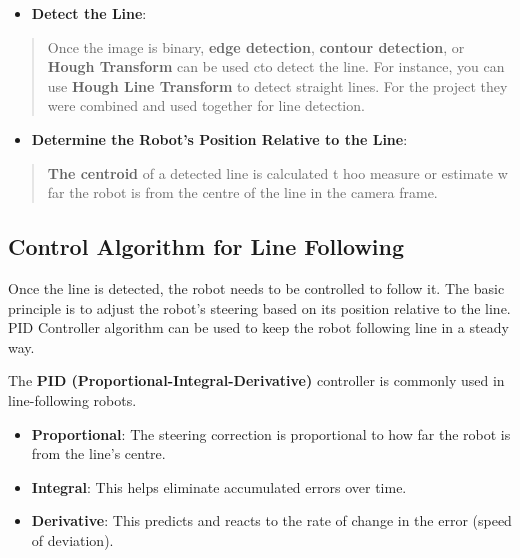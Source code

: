 \documentclass[../../main]{subfiles}
\begin{document}
    \begin{itemize}
    \item
      \textbf{Detect the Line}:
    \end{itemize}
    
    \begin{quote}
    Once the image is binary, \textbf{edge detection}, \textbf{contour
    detection}, or \textbf{Hough Transform} can be used cto detect the line.
    For instance, you can use \textbf{Hough Line Transform} to detect
    straight lines. For the project they were combined and used together for
    line detection.
    \end{quote}
    
    \begin{itemize}
    \item
      \textbf{Determine the Robot's Position Relative to the Line}:
    \end{itemize}
    
    \begin{quote}
    \textbf{The centroid} of a detected line is calculated t hoo measure or
    estimate w far the robot is from the centre of the line in the camera
    frame.
    \end{quote}
    
    \subsection{Control Algorithm for Line Following}
    
    Once the line is detected, the robot needs to be controlled to follow
    it. The basic principle is to adjust the robot's steering based on its
    position relative to the line. PID Controller algorithm can be used to
    keep the robot following line in a steady way.
    
    The \textbf{PID (Proportional-Integral-Derivative)} controller is
    commonly used in line-following robots.
    
    \begin{itemize}
    \item
      \textbf{Proportional}: The steering correction is proportional to how
      far the robot is from the line's centre.
    \item
      \textbf{Integral}: This helps eliminate accumulated errors over time.
    \item
      \textbf{Derivative}: This predicts and reacts to the rate of change in
      the error (speed of deviation).
    \end{itemize}
    
\end{document}
